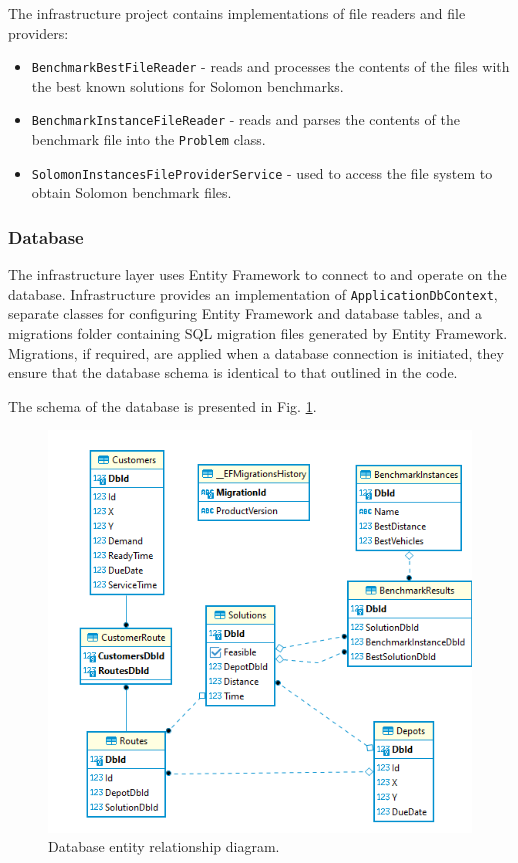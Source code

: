\documentclass[a4paper,twoside,12pt]{book}
\begin{document}
The infrastructure project contains implementations of file readers and file providers:
\begin{itemize}
    \item \lstinline{BenchmarkBestFileReader} - reads and processes the contents of the files with the best known solutions for Solomon benchmarks.
    \item \lstinline{BenchmarkInstanceFileReader} -  reads and parses the contents of the benchmark file into the \lstinline{Problem} class.
    \item \lstinline{SolomonInstancesFileProviderService} - used to access the file system to obtain Solomon benchmark files.
\end{itemize}

\subsubsection{Database}

The infrastructure layer uses Entity Framework to connect to and operate on the database. Infrastructure provides an implementation of \lstinline{ApplicationDbContext}, separate classes for configuring Entity Framework and database tables, and a migrations folder containing SQL migration files generated by Entity Framework. Migrations, if required, are applied when a database connection is initiated, they ensure that the database schema is identical to that outlined in the code. 


The schema of the database is presented in Fig. \ref{fig:erdDb}.
\begin{figure}
\centering
\includegraphics[width=\textwidth]{images/dbERD.png}
\caption{Database entity relationship diagram.}
\label{fig:erdDb}
\end{figure}
\end{document}

